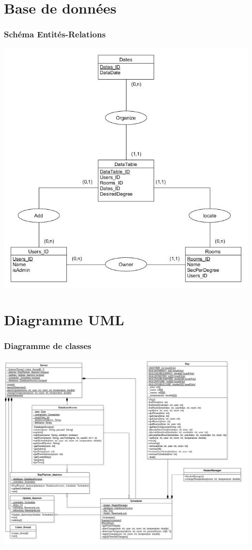 \documentclass{beamer}
\begin{document}
\section{Base de données}
\begin{frame}
\frametitle{Schéma Entités-Relations}
\begin{center}
\includegraphics[scale=0.35]{DataBase}
\end{center}
\end{frame}

\section{Diagramme UML}
\begin{frame}
\frametitle{Diagramme de classes}
\begin{center}
\includegraphics[scale=0.22]{classdiaSERVER}
\end{center}
\end{frame}
\end{document}
